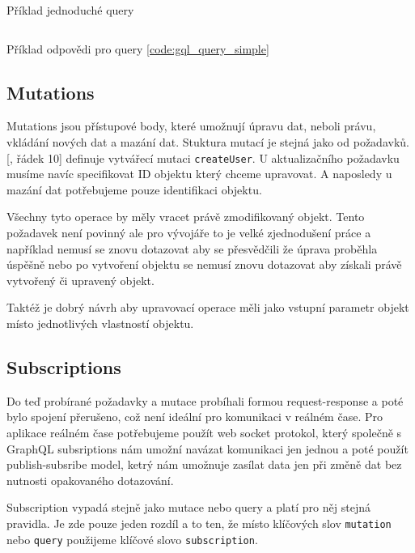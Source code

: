 \begin{listing}[H]
    \inputminted[]{graphql}{resources/code/standards/query.example.gql}
    \caption{Příklad jednoduché query}
    \label{code:gql_query_simple}
\end{listing}

\begin{listing}[H]
    \inputminted[]{json}{resources/code/standards/query.example.gql.jsonc}
    \caption{Příklad odpovědi pro query \ref{code:gql_query_simple}}
    \label{code:gql_query_simple_response}
\end{listing}

\subsection{Mutations}\label{sec:graphql:mutations}
Mutations jsou přístupové body, které umožnují úpravu dat, neboli právu, vkládání nových dat a mazání dat. Stuktura mutací je stejná jako od požadavků. [, řádek 10] definuje vytvářecí mutaci \texttt{createUser}. U aktualizačního požadavku musíme navíc specifikovat ID objektu který chceme upravovat. A naposledy u mazání dat potřebujeme pouze identifikaci objektu.

Všechny tyto operace by měly vracet právě zmodifikovaný objekt. Tento požadavek není povinný ale pro vývojáře to je velké zjednodušení práce a například nemusí se znovu dotazovat aby se přesvědčili že úprava proběhla úspěšně nebo po vytvoření objektu se nemusí znovu dotazovat aby získali právě vytvořený či upravený objekt.

Taktéž je dobrý návrh aby upravovací operace měli jako vstupní parametr objekt místo jednotlivých vlastností objektu.


\subsection{Subscriptions}\label{sec:graphql:subscriptions}
Do teď probírané požadavky a mutace probíhali formou request-response a poté bylo spojení přerušeno, což není ideální pro komunikaci v reálném čase. Pro aplikace reálném čase potřebujeme použít web socket protokol, který společně s GraphQL subsriptions nám umožní navázat komunikaci jen jednou a poté použít publish-subsribe model, ketrý nám umožnuje zasílat data jen při změně dat bez nutnosti opakovaného dotazování.

Subscription vypadá stejně jako mutace nebo query a platí pro něj stejná pravidla. Je zde pouze jeden rozdíl a to ten, že místo klíčových slov \texttt{mutation} nebo \texttt{query} použijeme klíčové slovo \texttt{subscription}.


